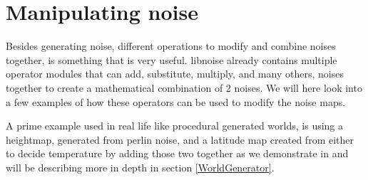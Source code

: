 \section{Manipulating noise}

Besides generating noise, different operations to modify and combine noises together, is something that is very useful. libnoise already contains multiple operator modules that can add, substitute, multiply, and many others, noises together to create a mathematical combination of 2 noises. We will here look into a few examples of how these operators can be used to modify the noise maps.

A prime example used in real life like procedural generated worlds, is using a heightmap, generated from perlin noise, and a latitude map created from either to decide temperature by adding those two together as we demonstrate in  and will be describing more in depth in section \ref{WorldGenerator}.

